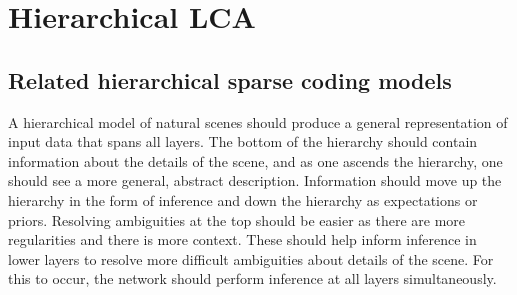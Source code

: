 \chapter{Hierarchical LCA}

\section{Related hierarchical sparse coding models}\label{sec:ch3_related_models}
A hierarchical model of natural scenes should produce a general representation of input data that spans all layers. The bottom of the hierarchy should contain information about the details of the scene, and as one ascends the hierarchy, one should see a more general, abstract description. Information should move up the hierarchy in the form of inference and down the hierarchy as expectations or priors. Resolving ambiguities at the top should be easier as there are more regularities and there is more context. These should help inform inference in lower layers to resolve more difficult ambiguities about details of the scene. For this to occur, the network should perform inference at all layers simultaneously.

